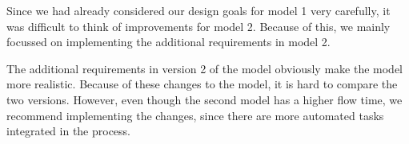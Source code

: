 
Since we had already considered our design goals for model 1 very carefully, it was difficult to think of improvements for model 2.
Because of this, we mainly focussed on implementing the additional requirements in model 2.

The additional requirements in version 2 of the model obviously make the model more realistic.
Because of these changes to the model, it is hard to compare the two versions.
However, even though the second model has a higher flow time, we recommend implementing the changes, since there are more automated tasks integrated in the process.
